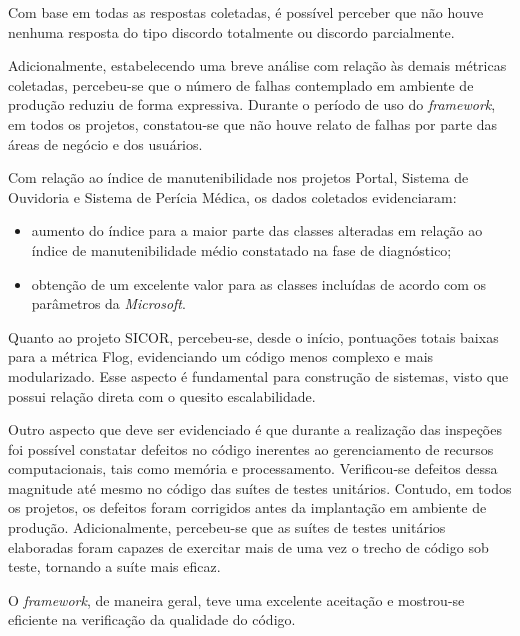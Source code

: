 Com base em todas as respostas coletadas, é possível perceber que não houve nenhuma resposta do tipo discordo totalmente ou discordo parcialmente. 

Adicionalmente, estabelecendo uma breve análise com relação às demais métricas coletadas, percebeu-se que o número de falhas contemplado em ambiente de produção reduziu de forma expressiva. Durante o período de uso do \textit{framework}, em todos os projetos, constatou-se que não houve relato de falhas por parte das áreas de negócio e dos usuários. 

Com relação ao índice de manutenibilidade nos projetos Portal, Sistema de Ouvidoria e Sistema de Perícia Médica, os dados coletados evidenciaram:

\begin{itemize}
	\item aumento do índice para a maior parte das classes alteradas em relação ao índice de manutenibilidade médio constatado na fase de diagnóstico;
	\item obtenção de um excelente valor para as classes incluídas de acordo com os parâmetros da \textit{Microsoft}.
\end{itemize}

Quanto ao projeto SICOR, percebeu-se, desde o início, pontuações totais baixas para a métrica Flog, evidenciando um código menos complexo e mais modularizado. Esse aspecto é fundamental para construção de sistemas, visto que possui relação direta com o quesito escalabilidade.

Outro aspecto que deve ser evidenciado é que durante a realização das inspeções foi possível constatar defeitos no código inerentes ao gerenciamento de recursos computacionais, tais como memória e processamento. Verificou-se defeitos dessa magnitude até mesmo no código das suítes de testes unitários. Contudo, em todos os projetos, os defeitos foram corrigidos antes da implantação em ambiente de produção. Adicionalmente, percebeu-se que as suítes de testes unitários elaboradas foram capazes de exercitar mais de uma vez o trecho de código sob teste, tornando a suíte mais eficaz.

O \textit{framework}, de maneira geral, teve uma excelente aceitação e mostrou-se eficiente na verificação da qualidade do código.

\clearpage